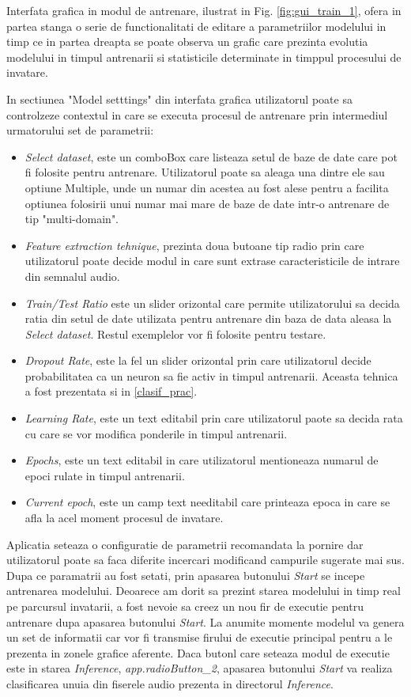 \documentclass[a4paper,12pt]{book}
\begin{document}
		Interfata grafica in modul de antrenare, ilustrat in Fig. \ref{fig:gui_train_1}, ofera in partea stanga o serie de functionalitati de editare a parametriilor modelului in timp ce in partea dreapta se poate observa un grafic care prezinta evolutia modelului in timpul antrenarii si statisticile determinate in timppul procesului de invatare. \par
		In sectiunea "Model setttings" din interfata grafica utilizatorul poate sa controlzeze contextul in care se executa procesul de antrenare prin intermediul urmatorului set de parametrii:
		\begin{itemize}
			\setlength{\leftmargin}{-4cm}
			\item \textit{Select dataset}, este un comboBox care listeaza setul de baze de date care pot fi folosite pentru antrenare. Utilizatorul poate sa aleaga una dintre ele sau optiune Multiple, unde un numar din acestea au fost alese pentru a facilita optiunea folosirii unui numar mai mare de baze de date intr-o antrenare de tip "multi-domain".
			\item \textit{Feature extraction tehnique}, prezinta doua butoane tip radio prin care utilizatorul poate decide modul in care sunt extrase caracteristicile de intrare din semnalul audio.
			\item \textit{Train/Test Ratio} este un slider orizontal care permite utilizatorului sa decida ratia din setul de date utilizata pentru antrenare din baza de data aleasa la \textit{Select dataset}. Restul exemplelor vor fi folosite pentru testare.
			\item \textit{Dropout Rate}, este la fel un slider orizontal prin care utilizatorul decide probabilitatea ca un neuron sa fie activ in timpul antrenarii. Aceasta tehnica a fost prezentata si in \ref{clasif_prac}.
			\item \textit{Learning Rate}, este un text editabil prin care utilizatorul paote sa decida rata cu care se vor modifica ponderile in timpul antrenarii.
			\item \textit{Epochs}, este un text editabil in care utilizatorul mentioneaza numarul de epoci rulate in timpul antrenarii.
			\item \textit{Current epoch}, este un camp text needitabil care printeaza epoca in care se afla la acel moment procesul de invatare.			
		\end{itemize}
		Aplicatia seteaza o configuratie de parametrii recomandata la pornire dar utilizatorul poate sa faca diferite incercari modificand campurile sugerate mai sus. Dupa ce paramatrii au fost setati, prin apasarea butonului \textit{Start} se incepe antrenarea modelului. Deoarece am dorit sa prezint starea modelului in timp real pe parcursul invatarii, a fost nevoie sa creez un nou fir de executie pentru antrenare dupa apasarea butonului \textit{Start}. La anumite momente modelul va genera un set de informatii car vor fi transmise firului de executie principal pentru a le prezenta in zonele grafice aferente. Daca butonl care seteaza modul de executie este in starea \textit{Inference}, \textit{app.radioButton\_2}, apasarea butonului \textit{Start} va realiza clasificarea unuia din fiserele audio prezenta in directorul \textit{Inference}.
		
\end{document}
